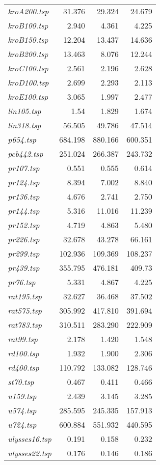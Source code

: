 {\begin{longtable}[H]{lrrr}
\textit{kroA200.tsp} & 31.376 & 29.324 & 24.679\\
\textit{kroB100.tsp} & 2.940 & 4.361 & 4.225\\
\textit{kroB150.tsp} & 12.204 & 13.437 & 14.636\\
\textit{kroB200.tsp} & 13.463 & 8.076 & 12.244\\
\textit{kroC100.tsp} & 2.561 & 2.196 & 2.628\\
\textit{kroD100.tsp} & 2.699 & 2.293 & 2.113\\
\textit{kroE100.tsp} & 3.065 & 1.997 & 2.477\\
\textit{lin105.tsp} & 1.54 & 1.829 & 1.674\\
\textit{lin318.tsp} & 56.505 & 49.786 & 47.514\\
\textit{p654.tsp} & 684.198 & 880.166 & 600.351\\
\textit{pcb442.tsp} & 251.024 & 266.387 & 243.732\\
\textit{pr107.tsp} & 0.551 & 0.555 & 0.614\\
\textit{pr124.tsp} & 8.394 & 7.002 & 8.840\\
\textit{pr136.tsp} & 4.676 & 2.741 & 2.750\\
\textit{pr144.tsp} & 5.316 & 11.016 & 11.239\\
\textit{pr152.tsp} & 4.719 & 4.863 & 5.480\\
\textit{pr226.tsp} & 32.678 & 43.278 & 66.161\\
\textit{pr299.tsp} & 102.936 & 109.369 & 108.237\\
\textit{pr439.tsp} & 355.795 & 476.181 & 409.73\\
\textit{pr76.tsp} & 5.331 & 4.867 & 4.225\\
\textit{rat195.tsp} & 32.627 & 36.468 & 37.502\\
\textit{rat575.tsp} & 305.992 & 417.810 & 391.694\\
\textit{rat783.tsp} & 310.511 & 283.290 & 222.909\\
\textit{rat99.tsp} & 2.178 & 1.420 & 1.548\\
\textit{rd100.tsp} & 1.932 & 1.900 & 2.306\\
\textit{rd400.tsp} & 110.792 & 133.082 & 128.746\\
\textit{st70.tsp} & 0.467 & 0.411 & 0.466\\
\textit{u159.tsp} & 2.439 & 3.145 & 3.285\\
\textit{u574.tsp} & 285.595 & 245.335 & 157.913\\
\textit{u724.tsp} & 600.884 & 551.932 & 440.595\\
\textit{ulysses16.tsp} & 0.191 & 0.158 & 0.232\\
\textit{ulysses22.tsp} & 0.176 & 0.146 & 0.186\\
\hline
\end{longtable}
}

